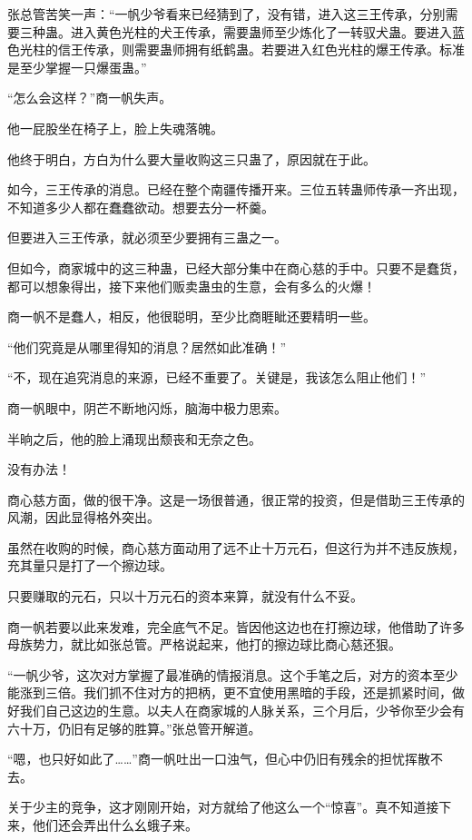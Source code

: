 \begin{this_body}
张总管苦笑一声：“一帆少爷看来已经猜到了，没有错，进入这三王传承，分别需要三种蛊。进入黄色光柱的犬王传承，需要蛊师至少炼化了一转驭犬蛊。要进入蓝色光柱的信王传承，则需要蛊师拥有纸鹤蛊。若要进入红色光柱的爆王传承。标准是至少掌握一只爆蛋蛊。”

“怎么会这样？”商一帆失声。

他一屁股坐在椅子上，脸上失魂落魄。

他终于明白，方白为什么要大量收购这三只蛊了，原因就在于此。

如今，三王传承的消息。已经在整个南疆传播开来。三位五转蛊师传承一齐出现，不知道多少人都在蠢蠢欲动。想要去分一杯羹。

但要进入三王传承，就必须至少要拥有三蛊之一。

但如今，商家城中的这三种蛊，已经大部分集中在商心慈的手中。只要不是蠢货，都可以想象得出，接下来他们贩卖蛊虫的生意，会有多么的火爆！

商一帆不是蠢人，相反，他很聪明，至少比商睚眦还要精明一些。

“他们究竟是从哪里得知的消息？居然如此准确！”

“不，现在追究消息的来源，已经不重要了。关键是，我该怎么阻止他们！”

商一帆眼中，阴芒不断地闪烁，脑海中极力思索。

半晌之后，他的脸上涌现出颓丧和无奈之色。

没有办法！

商心慈方面，做的很干净。这是一场很普通，很正常的投资，但是借助三王传承的风潮，因此显得格外突出。

虽然在收购的时候，商心慈方面动用了远不止十万元石，但这行为并不违反族规，充其量只是打了一个擦边球。

只要赚取的元石，只以十万元石的资本来算，就没有什么不妥。

商一帆若要以此来发难，完全底气不足。皆因他这边也在打擦边球，他借助了许多母族势力，就比如张总管。严格说起来，他打的擦边球比商心慈还狠。

“一帆少爷，这次对方掌握了最准确的情报消息。这个手笔之后，对方的资本至少能涨到三倍。我们抓不住对方的把柄，更不宜使用黑暗的手段，还是抓紧时间，做好我们自己这边的生意。以夫人在商家城的人脉关系，三个月后，少爷你至少会有六十万，仍旧有足够的胜算。”张总管开解道。

“嗯，也只好如此了……”商一帆吐出一口浊气，但心中仍旧有残余的担忧挥散不去。

关于少主的竞争，这才刚刚开始，对方就给了他这么一个“惊喜”。真不知道接下来，他们还会弄出什么幺蛾子来。


\end{this_body}
